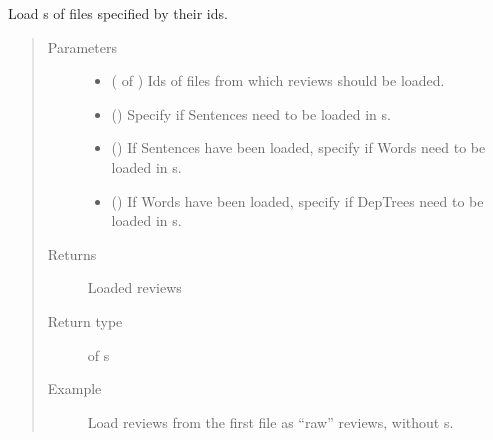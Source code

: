 \documentclass[letterpaper,10pt,english]{sphinxmanual}
\begin{document}
\begin{fulllineitems}
\label{\detokenize{index:loacore.load.review_load.load_reviews_by_id_files}}
Load  s of files specified by their ids.
\begin{quote}\begin{description}
\item[{Parameters}] \leavevmode\begin{itemize}
\item {} 
 ( of ) \textendash{} Ids of files from which reviews should be loaded.

\item {} 
 () \textendash{} Specify if Sentences need to be loaded in  s.

\item {} 
 () \textendash{} If Sentences have been loaded, specify if Words need to be loaded in  s.

\item {} 
 () \textendash{} If Words have been loaded, specify if DepTrees need to be loaded in  s.

\end{itemize}

\item[{Returns}] \leavevmode
Loaded reviews

\item[{Return type}] \leavevmode
{} of  s

\item[{Example}] \leavevmode
Load reviews from the first file as “raw” reviews, without  s.


\end{description}
\end{quote}
\end{fulllineitems}
\end{document}
